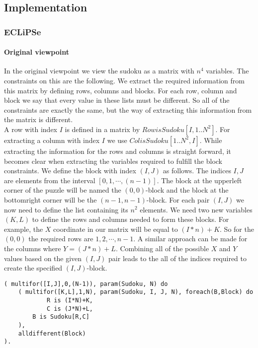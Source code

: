 \subsection{Implementation}
\subsubsection{ECLiPSe}
\paragraph*{Original viewpoint}
In the original viewpoint we view the sudoku as a matrix with $n^{4}$ variables.
The constraints on this are the following.
We extract the required information from this matrix by defining rows, columns and blocks.
For each row, column and block we say that every value in these lists must be different.
So all of the constraints are exactly the same, but the way of extracting this information from the matrix is different.\\

A row with index $I$ is defined in a matrix by $Row is Sudoku[I,1..N^{2}]$. 
For extracting a column with index $I$ we use $Col is Sudoku[1..N^{2},I]$.
While extracting the information for the rows and columns is straight forward, it becomes clear when extracting the variables required to fulfill the block constraints.
We define the block with index $(I,J)$ as follows. 
The indices $I, J$ are elements from the interval $[0,1,\cdots,(n-1)]$.
The block at the upperleft corner of the puzzle will be named the $(0,0)$-block and the block at the bottomright corner will be the $(n-1,n-1)$-block.
For each pair $(I,J)$ we now need to define the list containing its $n^{2}$ elements.
We need two new variables $(K,L)$ to define the rows and columns needed to form these blocks.
For example, the $X$ coordinate in our matrix will be equal to $(I*n)+K$. 
So for the $(0,0)$ the required rows are $1,2,\cdots,n-1$.
A similar approach can be made for the columns where $Y = (J*n)+L$.
Combining all of the possible $X$ and $Y$ values based on the given $(I,J)$ pair leads to the all of the indices required to create the specified $(I,J)$-block.

\begin{lstlisting}
( multifor([I,J],0,(N-1)), param(Sudoku, N) do
	( multifor([K,L],1,N), param(Sudoku, I, J, N), foreach(B,Block) do
        	R is (I*N)+K,
        	C is (J*N)+L,
		B is Sudoku[R,C]
    ),
	alldifferent(Block)
).
\end{lstlisting}


